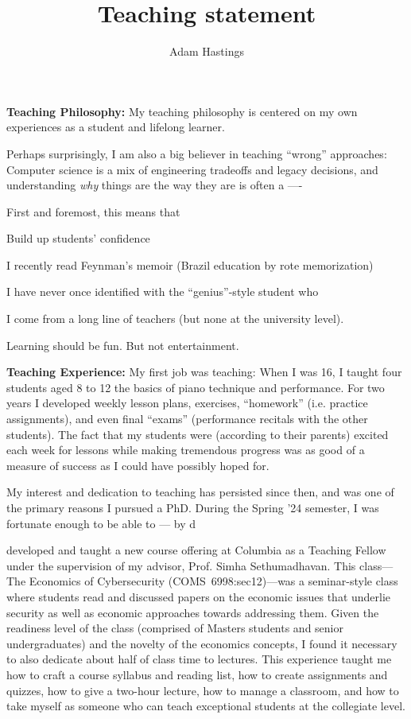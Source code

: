 \documentclass[11pt]{amsart}
\begin{document}
\title{Teaching statement}
\author{Adam Hastings}
\maketitle


\textbf{Teaching Philosophy:}
My teaching philosophy is centered on my own experiences as a student and lifelong learner. 

Perhaps surprisingly, I am also a big believer in teaching ``wrong'' approaches: Computer science is a mix of engineering tradeoffs and legacy decisions, and understanding \textit{why} things are the way they are is often a ---- 

First and foremost, this means that 

Build up students' confidence 

I recently read Feynman's memoir (Brazil education by rote memorization)

I have never once identified with the ``genius''-style student who 

I come from a long line of teachers (but none at the university level).

Learning should be fun. But not entertainment. 

\textbf{Teaching Experience:} 
My first job was teaching: 
When I was 16, I taught four students aged 8 to 12 the basics of piano technique and performance. 
For two years I developed weekly lesson plans, exercises, ``homework'' (i.e. practice assignments), and even final ``exams'' (performance recitals with the other students).
The fact that my students were (according to their parents) excited each week for lessons while making tremendous progress was as good of a measure of success as I could have possibly hoped for.

My interest and dedication to teaching has persisted since then, and was one of the primary reasons I pursued a PhD.
During the Spring '24 semester, I was fortunate enough to be able to --- by d

developed and taught a new course offering at Columbia as a Teaching Fellow under the supervision of my advisor, Prof. Simha Sethumadhavan.
This class---The Economics of Cybersecurity (COMS~6998:sec12)---was a seminar-style class where students read and discussed papers on the economic issues that underlie security  as well as economic approaches towards addressing them.
Given the readiness level of the class (comprised of Masters students and senior undergraduates) and the novelty of the economics concepts, I found it necessary to also dedicate about half of class time to lectures. 
This experience taught me how to craft a course syllabus and reading list, how to create assignments and quizzes, how to give a two-hour lecture, how to manage a classroom, and how to take myself as someone who can teach exceptional students at the collegiate level. 
\end{document}
